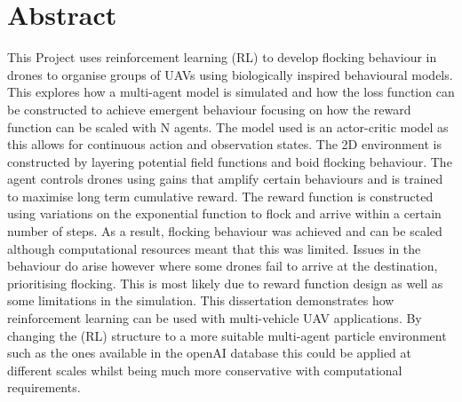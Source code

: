 \documentclass[
12pt, %
oneside, %
singlespacing, %
parskip, %
]{article} %
\renewenvironment{abstract}{
	\section*{Abstract}
	\bigskip
	\addcontentsline{toc}{section}{Abstract}}{\clearpage}
\begin{document}
\renewcommand{\arraystretch}{1.3}


\begin{abstract}
This Project uses reinforcement learning (RL) to develop flocking behaviour in drones to organise groups of UAVs using biologically inspired behavioural models. This explores how a multi-agent model is simulated and how the loss function can be constructed to achieve emergent behaviour focusing on how the reward function can be scaled with N agents. The model used is an actor-critic model as this allows for continuous action and observation states. The 2D environment is constructed by layering potential field functions and boid flocking behaviour. The agent controls drones using gains that amplify certain behaviours and is trained to maximise long term cumulative reward. The reward function is constructed using variations on the exponential function to flock and arrive within a certain number of steps. 
As a result, flocking behaviour was achieved and can be scaled although computational resources meant that this was limited. Issues in the behaviour do arise however where some drones fail to arrive at the destination, prioritising flocking. This is most likely due to reward function design as well as some limitations in the simulation. This dissertation demonstrates how reinforcement learning can be used with multi-vehicle UAV applications. By changing the (RL) structure to a more suitable multi-agent particle environment such as the ones available in the openAI database this could be applied at different scales whilst being much more conservative with computational requirements.
\end{abstract}

\end{document}
